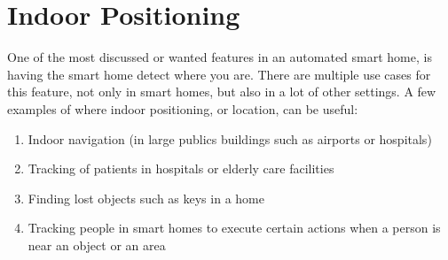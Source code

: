 \section{Indoor Positioning}\label{sec:indoor-positioning}
One of the most discussed or wanted features in an automated smart home, 
is having the smart home detect where you are.
There are multiple use cases for this feature, 
not only in smart homes, but also in a lot of other settings. 
A few examples of where indoor positioning, or location, can be useful:
\begin{enumerate}
    \item Indoor navigation (\eg in large publics buildings such as airports or hospitals)
    \item Tracking of patients in \eg hospitals or elderly care facilities
    \item Finding lost objects such as keys in a home
    \item Tracking people in smart homes to execute certain actions when a person is near an object or an area
\end{enumerate}

